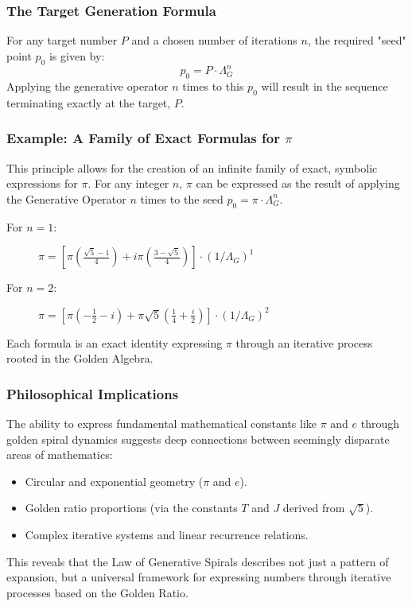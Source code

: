 \subsubsection{The Target Generation Formula}
For any target number $P$ and a chosen number of iterations $n$, the required "seed" point $p_0$ is given by:
$$p_0 = P \cdot \Lambda_G^n$$
Applying the generative operator $n$ times to this $p_0$ will result in the sequence terminating exactly at the target, $P$.

\subsubsection{Example: A Family of Exact Formulas for \texorpdfstring{$\pi$}{π}}
This principle allows for the creation of an infinite family of exact, symbolic expressions for $\pi$. For any integer $n$, $\pi$ can be expressed as the result of applying the Generative Operator $n$ times to the seed $p_0 = \pi \cdot \Lambda_G^n$.
\begin{description}
    \item[For $n=1$:] $\pi = \left[ \pi\left(\frac{\sqrt{5}-1}{4}\right) + i\pi\left(\frac{3-\sqrt{5}}{4}\right) \right] \cdot (1/\Lambda_G)^1$
    \item[For $n=2$:] $\pi = \left[ \pi\left(-\frac{1}{2} - i\right) + \pi\sqrt{5}\left(\frac{1}{4} + \frac{i}{2}\right) \right] \cdot (1/\Lambda_G)^2$
\end{description}
Each formula is an exact identity expressing $\pi$ through an iterative process rooted in the Golden Algebra.

\subsubsection{Philosophical Implications}
The ability to express fundamental mathematical constants like $\pi$ and $e$ through golden spiral dynamics suggests deep connections between seemingly disparate areas of mathematics:
\begin{itemize}
    \item Circular and exponential geometry ($\pi$ and $e$).
    \item Golden ratio proportions (via the constants $T$ and $J$ derived from $\sqrt{5}$).
    \item Complex iterative systems and linear recurrence relations.
\end{itemize}
This reveals that the Law of Generative Spirals describes not just a pattern of expansion, but a universal framework for expressing numbers through iterative processes based on the Golden Ratio.